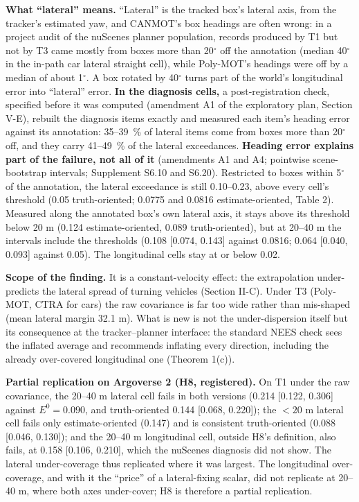 \documentclass{ieeeaccess}
\begin{document}
\textbf{What ``lateral'' means.} ``Lateral'' is the tracked box's lateral axis, from the tracker's estimated yaw, and CANMOT's box headings are often wrong: in a project audit of the nuScenes planner population, records produced by T1 but not by T3 came mostly from boxes more than 20$^{\circ}$ off the annotation (median 40$^{\circ}$ in the in-path car lateral straight cell), while Poly-MOT's headings were off by a median of about 1$^{\circ}$. A box rotated by 40$^{\circ}$ turns part of the world's longitudinal error into ``lateral'' error. \textbf{In the diagnosis cells,} a post-registration check, specified before it was computed (amendment A1 of the exploratory plan, Section V-E), rebuilt the diagnosis items exactly and measured each item's heading error against its annotation: 35--39~\% of lateral items come from boxes more than 20$^{\circ}$ off, and they carry 41--49~\% of the lateral exceedances. \textbf{Heading error explains part of the failure, not all of it} (amendments A1 and A4; pointwise scene-bootstrap intervals; Supplement S6.10 and S6.20). Restricted to boxes within 5$^{\circ}$ of the annotation, the lateral exceedance is still 0.10--0.23, above every cell's threshold (0.05 truth-oriented; 0.0775 and 0.0816 estimate-oriented, Table 2). Measured along the annotated box's own lateral axis, it stays above its threshold below 20 m (0.124 estimate-oriented, 0.089 truth-oriented), but at 20--40 m the intervals include the thresholds (0.108 [0.074, 0.143] against 0.0816; 0.064 [0.040, 0.093] against 0.05). The longitudinal cells stay at or below 0.02.

\textbf{Scope of the finding.} It is a constant-velocity effect: the extrapolation under-predicts the lateral spread of turning vehicles (Section II-C). Under T3 (Poly-MOT, CTRA for cars) the raw covariance is far too wide rather than mis-shaped (mean lateral margin 32.1 m). What is new is not the under-dispersion itself but its consequence at the tracker--planner interface: the standard NEES check sees the inflated average and recommends inflating every direction, including the already over-covered longitudinal one (Theorem 1(c)).

\textbf{Partial replication on Argoverse 2 (H8, registered).} On T1 under the raw covariance, the 20--40 m lateral cell fails in both versions (0.214 [0.122, 0.306] against $E^{0} = 0.090$, and truth-oriented 0.144 [0.068, 0.220]); the $< 20$ m lateral cell fails only estimate-oriented (0.147) and is consistent truth-oriented (0.088 [0.046, 0.130]); and the 20--40 m longitudinal cell, outside H8's definition, also fails, at 0.158 [0.106, 0.210], which the nuScenes diagnosis did not show. The lateral under-coverage thus replicated where it was largest. The longitudinal over-coverage, and with it the ``price'' of a lateral-fixing scalar, did not replicate at 20--40 m, where both axes under-cover; H8 is therefore a partial replication.
\end{document}
